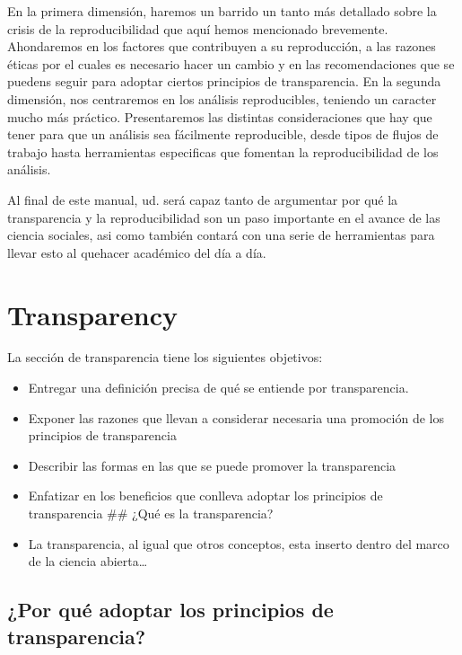\documentclass[
]{book}
\begin{document}
En la primera dimensión, haremos un barrido un tanto más detallado sobre la crisis de la reproducibilidad que aquí hemos mencionado brevemente. Ahondaremos en los factores que contribuyen a su reproducción, a las razones éticas por el cuales es necesario hacer un cambio y en las recomendaciones que se puedens seguir para adoptar ciertos principios de transparencia. En la segunda dimensión, nos centraremos en los análisis reproducibles, teniendo un caracter mucho más práctico. Presentaremos las distintas consideraciones que hay que tener para que un análisis sea fácilmente reproducible, desde tipos de flujos de trabajo hasta herramientas especificas que fomentan la reproducibilidad de los análisis.

Al final de este manual, ud. será capaz tanto de argumentar por qué la transparencia y la reproducibilidad son un paso importante en el avance de las ciencia sociales, asi como también contará con una serie de herramientas para llevar esto al quehacer académico del día a día.

\hypertarget{transparency}{%
\chapter{Transparency}\label{transparency}}

La sección de transparencia tiene los siguientes objetivos:

\begin{itemize}
\item
  Entregar una definición precisa de qué se entiende por transparencia.
\item
  Exponer las razones que llevan a considerar necesaria una promoción de los principios de transparencia
\item
  Describir las formas en las que se puede promover la transparencia
\item
  Enfatizar en los beneficios que conlleva adoptar los principios de transparencia
  \#\# ¿Qué es la transparencia?
\item
  La transparencia, al igual que otros conceptos, esta inserto dentro del marco de la ciencia abierta\ldots{}
\end{itemize}

\hypertarget{por-quuxe9-adoptar-los-principios-de-transparencia}{%
\section{¿Por qué adoptar los principios de transparencia?}\label{por-quuxe9-adoptar-los-principios-de-transparencia}}
\end{document}
